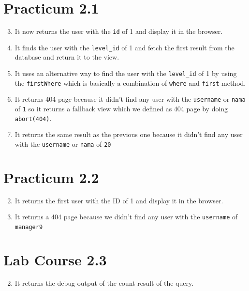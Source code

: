 \documentclass[12pt,titlepage]{article}
\begin{document}
\section{Practicum 2.1}
\begin{enumerate}
    \setcounter{enumi}{2}
    \item {
        It now returns the user with the \texttt{id} of 1 and display it in the browser.
    }
    \setcounter{enumi}{4}
    \item {
        It finds the user with the \texttt{level\_id} of 1 and fetch the first result from the database and return it to the view.
    }
    \setcounter{enumi}{6}
    \item {
        It uses an alternative way to find the user with the \texttt{level\_id} of 1 by using the \texttt{firstWhere} which is basically a combination
        of \texttt{where} and \texttt{first} method.
    }
    \setcounter{enumi}{8}
    \item {
        It returns 404 page because it didn't find any user with the \texttt{username} or \texttt{nama} of \texttt{1}
        so it returns a fallback view which we defined as 404 page by doing \texttt{abort(404)}.
    }
    \setcounter{enumi}{10}
    \item {
        It returns the same result as the previous one because it didn't find any user with the \texttt{username} or \texttt{nama} of \texttt{20}
    }
\end{enumerate}

\section{Practicum 2.2}
\begin{enumerate}
    \setcounter{enumi}{1}
    \item {
        It returns the first user with the ID of 1 and display it in the browser.
    }
    \setcounter{enumi}{3}
    \item {
        It returns a 404 page because we didn't find any user with the \texttt{username} of \texttt{manager9}
    }
\end{enumerate}

\section{Lab Course 2.3}
\begin{enumerate}
    \setcounter{enumi}{1}
    \item {
        It returns the debug output of the count result of the query.
    }
\end{enumerate}
\end{document}
